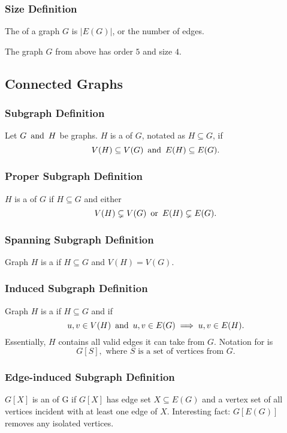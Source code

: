 \subsubsection*{Size Definition}
The  of a graph $G$ is $|E(G)|$, or the number of edges.

The graph $G$ from above has order $5$ and size $4$.

\subsection{Connected Graphs}

\subsubsection*{Subgraph Definition}
Let $G \operatorname{~\text{and}~} H$ be graphs. $H$ is a  of $G$, notated as $H \subseteq G$, if
\[
    V(H) \subseteq V(G) \operatorname{~\text{and}~} E(H) \subseteq E(G).
\]

\subsubsection*{Proper Subgraph Definition}
$H$ is a  of $G$ if $H \subseteq G$ and either
\[
    V(H) \subsetneq V(G) \operatorname{~\text{or}~} E(H) \subsetneq E(G).
\]

\subsubsection*{Spanning Subgraph Definition}
Graph $H$ is a  if $H \subseteq G$ and $V(H) = V(G)$.

\subsubsection*{Induced Subgraph Definition}
Graph $H$ is a  if $H \subseteq G$ and if
\[
    u,v \in V(H) \operatorname{~\text{and}~} u,v \in E(G) \implies u,v \in E(H).
\]
Essentially, $H$ contains all valid edges it can take from $G$. Notation for  is
\[
    G[S], \text{ where $S$ is a set of vertices from $G$}.
\]

\subsubsection*{Edge-induced Subgraph Definition}
$G[X]$ is an  of G if $G[X]$ has edge set $X \subseteq E(G)$ and a vertex set of all vertices incident with at least one edge of $X$. Interesting fact: $G[E(G)]$ removes any isolated vertices.

